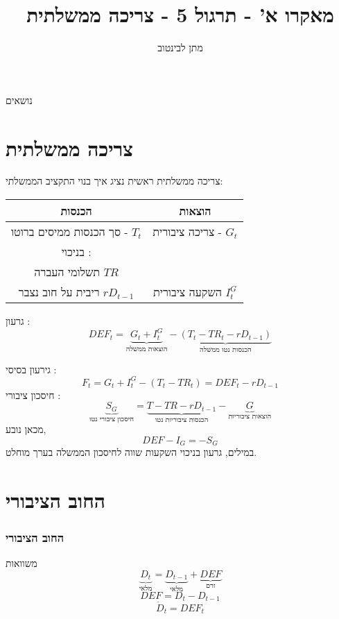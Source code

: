 \documentclass[usenames,dvipsnames]{beamer}
\title[]{{מאקרו א' - תרגול 5 - צריכה ממשלתית}}
\author{\texthebrew{ מתן לבינטוב}}
\institute[{{ אב"ג}}]{{ אוניברסיטת בן גוריון בנגב}}
\date{}
\begin{document}
\begin{RTL}
\begin{frame}
\titlepage
\end{frame}
\begin{frame}{נושאים}
    \tableofcontents
\end{frame}
\section{צריכה ממשלתית}
\begin{frame}[allowframebreaks]{צריכה ממשלתית}
    ראשית נציג איך בנוי התקציב הממשלתי:
    \begin{table}
    \centering
    \begin{tabular}{|c|c|} \hline 
         הכנסות& הוצאות\\ \hline 
         סך הכנסות ממיסים ברוטו  - $T_t$& צריכה ציבורית  - $G_t$\\ \hline 
         בניכוי : \\ תשלומי העברה $TR$ \\ ריבית על חוב נצבר $rD_{t-1}$&השקעה ציבורית $I_t^G$ \\ \hline
    \end{tabular}
    \end{table}
גרעון :
\begin{equation*}
    DEF_t = \underbrace{ G_t + I_t^G}_{\text{הוצאות ממשלה}} - \underbrace{(T_t -TR_t - rD_{t-1})}_{\text{הכנסות נטו ממשלה}}
\end{equation*}

גירעון בסיסי :
\begin{equation*}
    F_t = G_t + I_t^G - (T_t -TR_t) = DEF_t - rD_{t-1}
\end{equation*}
חיסכון ציבורי :
\begin{equation*}
   \underbrace{ S_G}_{\text{חיסכון ציבורי נטו}} = \underbrace{T - TR -rD_{t-1}}_{\text{הכנסות ציבוריות נטו}}-\underbrace{G}_{\text{הוצאות ציבוריות}}
\end{equation*}
מכאן נובע, 
\begin{equation*}
    DEF - I_G = -S_G
\end{equation*}
במילים, גרעון בניכוי השקעות שווה לחיסכון הממשלה בערך מוחלט.

\end{frame}
\section{החוב הציבורי}
\begin{frame}[allowframebreaks]
    \frametitle{החוב הציבורי}
    \begin{block}{משוואות}
        \begin{equation*}
            \underbrace{D_t}_{\text{מלאי}} = \underbrace{D_{t-1}}_{\text{מלאי}} + \underbrace{DEF}_{\text{זרם}}
        \end{equation*}
        \begin{equation*}
            DEF = D_t - D_{t-1}
        \end{equation*}
        \begin{equation*}
            \dot D_t = DEF_t
        \end{equation*}
    \end{block}


\end{frame}
\end{RTL}
\end{document}
